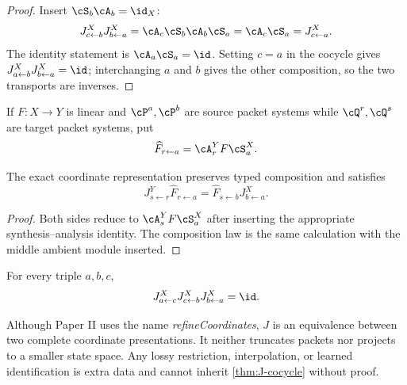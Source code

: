 \begin{proof}
Insert $\cS_b\cA_b=\id_X$:
\[
J^X_{c\leftarrow b}J^X_{b\leftarrow a}
=\cA_c\cS_b\cA_b\cS_a
=\cA_c\cS_a
=J^X_{c\leftarrow a}.
\]
The identity statement is $\cA_a\cS_a=\id$.  Setting $c=a$ in the cocycle
gives $J^X_{a\leftarrow b}J^X_{b\leftarrow a}=\id$; interchanging $a$ and $b$
gives the other composition, so the two transports are inverses.
\end{proof}

If $F:X\to Y$ is linear and $\cP^a,\cP^b$ are source packet systems while
$\cQ^r,\cQ^s$ are target packet systems, put
\[
\widehat F_{r\leftarrow a}
=
\cA^Y_rF\cS^X_a.
\]

\begin{theorem}
\label{thm:canonical-naturality}
The exact coordinate representation preserves typed composition and satisfies
\[
J^Y_{s\leftarrow r}\widehat F_{r\leftarrow a}
=
\widehat F_{s\leftarrow b}J^X_{b\leftarrow a}.
\]
\end{theorem}

\begin{proof}
Both sides reduce to $\cA^Y_sF\cS^X_a$ after inserting the appropriate
synthesis--analysis identity.  The composition law is the same calculation
with the middle ambient module inserted.
\end{proof}

\begin{corollary}
\label{cor:J-flat}
For every triple $a,b,c$,
\[
J^X_{a\leftarrow c}J^X_{c\leftarrow b}J^X_{b\leftarrow a}=\id.
\]
\end{corollary}

\begin{boundary}
Although Paper II uses the name \emph{refineCoordinates}, $J$ is an
equivalence between two complete coordinate presentations.  It neither
truncates packets nor projects to a smaller state space.  Any lossy
restriction, interpolation, or learned identification is extra data and
cannot inherit \cref{thm:J-cocycle} without proof.
\end{boundary}

